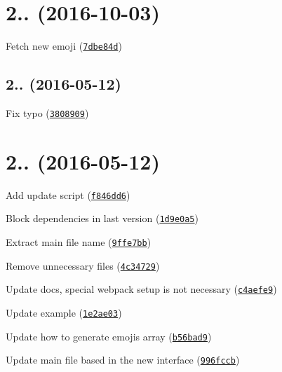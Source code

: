 \label{_2.1.0}%
 \section*{2.. (2016-\/10-\/03)}


\begin{DoxyItemize}
\item Fetch new emoji (\href{https://github.com/kikobeats/emojis-list/commit/7dbe84d}{\tt 7dbe84d})
\end{DoxyItemize}

\label{_2.0.1}%
 \subsection*{2.. (2016-\/05-\/12)}


\begin{DoxyItemize}
\item Fix typo (\href{https://github.com/kikobeats/emojis-list/commit/3808909}{\tt 3808909})
\end{DoxyItemize}

\label{_2.0.0}%
 \section*{2.. (2016-\/05-\/12)}


\begin{DoxyItemize}
\item Add update script (\href{https://github.com/kikobeats/emojis-list/commit/f846dd6}{\tt f846dd6})
\item Block dependencies in last version (\href{https://github.com/kikobeats/emojis-list/commit/1d9e0a5}{\tt 1d9e0a5})
\item Extract main file name (\href{https://github.com/kikobeats/emojis-list/commit/9ffe7bb}{\tt 9ffe7bb})
\item Remove unnecessary files (\href{https://github.com/kikobeats/emojis-list/commit/4c34729}{\tt 4c34729})
\item Update docs, special webpack setup is not necessary (\href{https://github.com/kikobeats/emojis-list/commit/c4aefe9}{\tt c4aefe9})
\item Update example (\href{https://github.com/kikobeats/emojis-list/commit/1e2ae03}{\tt 1e2ae03})
\item Update how to generate emojis array (\href{https://github.com/kikobeats/emojis-list/commit/b56bad9}{\tt b56bad9})
\item Update main file based in the new interface (\href{https://github.com/kikobeats/emojis-list/commit/996fccb}{\tt 996fccb})
\end{DoxyItemize}

